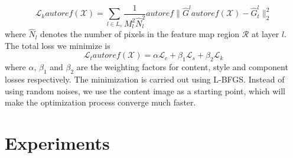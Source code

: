\documentclass[10pt,twocolumn,letterpaper]{article}
\begin{document}
\begin{equation}
\mathcal{L}_{k} autoref( \mathcal{X} ) = \sum\limits_{l \in {L_s}} {\frac{1}{{M_l^2{\hat N}_l^2}}autoref\| {{{\hat G}^l}autoref( \mathcal{X} ) - {\hat G}_t^l} \|_2^2} 
\label{eq:component_loss}
\end{equation}
where ${\hat N}_l$ denotes the number of pixels in the feature map region $\mathcal R$ at layer $l$. The total loss we minimize is 
\begin{equation}
\mathcal{L}_{t}autoref( \mathcal{X} ) = \alpha \mathcal{L}_{c} + \beta_1 \mathcal{L}_{s} + \beta_2 \mathcal{L}_{k}
\label{eq:Total_loss}
\end{equation}
where $\alpha$, $\beta_1$ and $\beta_2$ are the weighting factors for content, style and component losses respectively. The minimization is carried out using L-BFGS. Instead of using random noises, we use the content image as a starting point, which will make the optimization process converge much faster. 
{
\section{Experiments}
}
\end{document}
